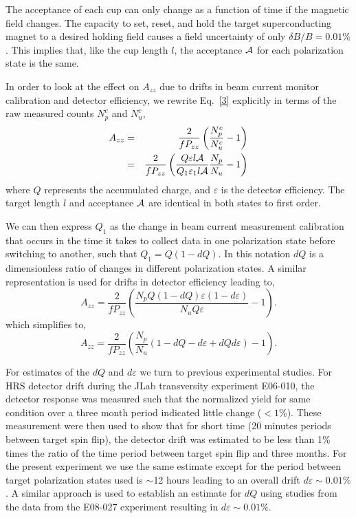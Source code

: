 The acceptance of each cup can only change as a function of time if the magnetic field changes.  
The capacity to set, reset, and hold the target superconducting magnet to a desired holding field causes a field uncertainty of only $\delta B /B=0.01\%$. 
This implies that, like the cup length $l$, the acceptance ${\cal A}$ for each polarization state is the same.

In order to look at the effect on $A_{zz}$ due to drifts in beam current monitor calibration and detector efficiency, we rewrite Eq.~\ref{3} explicitly in terms of the raw measured counts $N_p^c$ and $N_u^c$,
\begin{eqnarray} \label{3c}
\nonumber
A_{zz}&=&\frac{2}{fP_{zz}}\left(\frac{N^c_p}{N^c_u}-1\right) \\
      &=&\frac{2}{fP_{zz}}\left(\frac{Q\varepsilon l \cal{A}}{Q_1\varepsilon_1 l \cal{A}}\frac{N_p}{N_u}-1\right)
\end{eqnarray}
where $Q$ represents the accumulated charge, and $\varepsilon$ is the detector efficiency. The target length $l$ and acceptance $\cal{A}$ are identical in both states to first order.

We can then express $Q_1$ as the change in beam current measurement calibration that occurs in
the time it takes to collect data in one polarization state before switching to another, such that $Q_1=Q(1-dQ)$.
In this notation $dQ$ is a dimensionless ratio of changes in different polarization states.  A similar representation
is used for drifts in detector efficiency leading to,
\begin{equation}
A_{zz}=\frac{2}{fP_{zz}}\left(\frac{N_pQ(1-dQ)\varepsilon(1-d\varepsilon)}{N_u Q\varepsilon}-1\right).
\end{equation}
which simplifies to,
\begin{equation}
A_{zz}=\frac{2}{fP_{zz}}\left(\frac{N_p}{N_u}(1-dQ-d\varepsilon+dQd\varepsilon)-1\right).
\end{equation}

For estimates of the $dQ$ and $d\varepsilon$ we turn to previous experimental
studies.  For HRS detector drift during the JLab transversity experiment E06-010, the detector response was measured such that the normalized yield for same condition over a three month period indicated little change ($<1$\%).
These measurement were then used to show that for short time (20 minutes periods between target spin flip),
the detector drift was estimated to be less than 1\% times the ratio of the time period between target spin flip and three months.
For the present experiment we use the same estimate except for the period between target polarization states used is
$\sim$12 hours leading to an overall drift $d\varepsilon\sim0.01\%$.  A similar approach is used to establish an estimate
for $dQ$ using studies from the data from the E08-027 experiment resulting in $d\varepsilon\sim0.01\%$.

